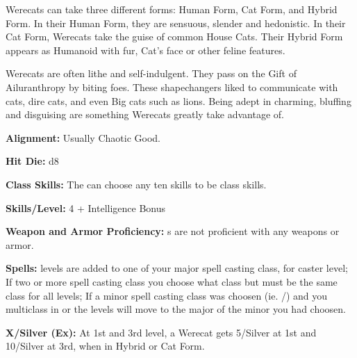 
Werecats can take three different forms: Human Form, Cat Form, and Hybrid Form. In their Human Form, they are sensuous, slender and hedonistic. In their Cat Form, Werecats take the guise of common House Cats. Their Hybrid Form appears as Humanoid with fur, Cat's face or other feline features.

Werecats are often lithe and self-indulgent. They pass on the Gift of Ailuranthropy by biting foes. These shapechangers liked to communicate with cats, dire cats, and even Big cats such as lions. Being adept in charming, bluffing and disguising are something Werecats greatly take advantage of.

\textbf{Alignment:} Usually Chaotic Good.

\textbf{Hit Die:} d8

\textbf{Class Skills:} The \currentclassname{} can choose any ten skills to be class skills.

\textbf{Skills/Level:} 4 + Intelligence Bonus

\poorbab{}
\poorfor{}
\goodref{}
\poorwil{}

\begin{classtable}
\end{classtable}

\classfeatures

\textbf{Weapon and Armor Proficiency:} \currentclassname{}s are not proficient with any weapons or armor.

\textbf{Spells:} \currentclassname{} levels are added to one of your major spell casting class, for caster level; If two or more spell casting class you choose what class but must be the same class for all \currentclassname{} levels; If a minor spell casting class was choosen (ie. /) and you multiclass in  or  the \currentclassname{} levels will move to the major of the minor you had choosen.

\textbf{ X/Silver (Ex):} At 1st and 3rd level, a Werecat gets  5/Silver at 1st and 10/Silver at 3rd, when in Hybrid or Cat Form.

